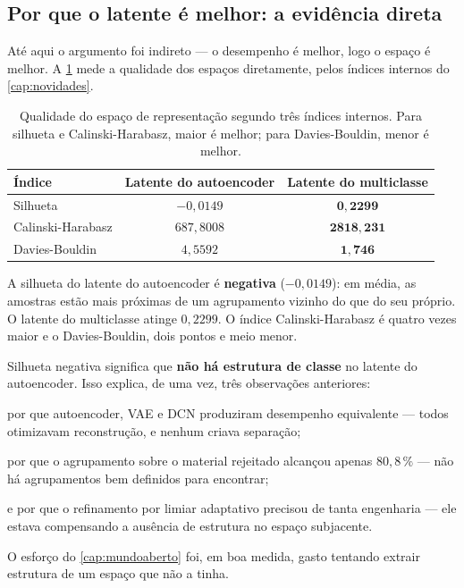 \subsection{Por que o latente é melhor: a evidência direta}

Até aqui o argumento foi indireto --- o desempenho é melhor, logo o espaço é melhor. A
\cref{tab:mahal-qualidade} mede a qualidade dos espaços diretamente, pelos índices
internos do \cref{cap:novidades}.

\begin{table}[htbp]
\centering
\caption{Qualidade do espaço de representação segundo três índices internos. Para
silhueta e Calinski-Harabasz, maior é melhor; para Davies-Bouldin, menor é melhor.}
\label{tab:mahal-qualidade}
\small
\begin{tabular}{lcc}
\toprule
\textbf{Índice} & \textbf{Latente do autoencoder} & \textbf{Latente do multiclasse} \\
\midrule
Silhueta            & $-0{,}0149$   & $\bm{0{,}2299}$ \\
Calinski-Harabasz   & $687{,}8008$  & $\bm{2818{,}231}$ \\
Davies-Bouldin      & $4{,}5592$    & $\bm{1{,}746}$ \\
\bottomrule
\end{tabular}
\end{table}

\begin{resultadochave}
A silhueta do latente do autoencoder é \textbf{negativa} ($-0{,}0149$): em média, as
amostras estão mais próximas de um agrupamento vizinho do que do seu próprio. O latente
do multiclasse atinge $0{,}2299$. O índice Calinski-Harabasz é quatro vezes maior e o
Davies-Bouldin, dois pontos e meio menor.
\end{resultadochave}

\begin{destaque}
Silhueta negativa significa que \textbf{não há estrutura de classe} no latente do
autoencoder. Isso explica, de uma vez, três observações anteriores:

por que autoencoder, VAE e DCN produziram desempenho equivalente --- todos otimizavam
reconstrução, e nenhum criava separação;

por que o agrupamento sobre o material rejeitado alcançou apenas $80{,}8\,\%$ --- não há
agrupamentos bem definidos para encontrar;

e por que o refinamento por limiar adaptativo precisou de tanta engenharia --- ele estava
compensando a ausência de estrutura no espaço subjacente.

O esforço do \cref{cap:mundoaberto} foi, em boa medida, gasto tentando extrair estrutura
de um espaço que não a tinha.
\end{destaque}

